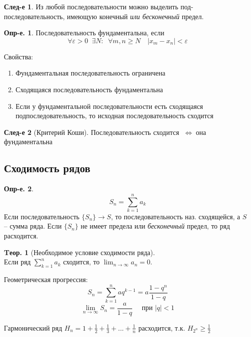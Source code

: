 \documentclass[a4paper,12pt]{article}
\numberwithin{figure}{section}
\theoremstyle{definition}
\newtheorem{definition}{Опр-е.}[section]
\theoremstyle{definition}
\newtheorem{theorem}{Tеор.}[section]
\newtheorem*{corollary}{След-е} %
\def\DS{\displaystyle}
\def\.{\;\;}
\def\eps{\varepsilon}
\def\ntoinf{n\to\infty}
\def\geqs{\geqslant}
\def\iff{$\;\Longleftrightarrow\;$}
\begin{document}
\begin{corollary}
	Из любой последовательности можно выделить под-последовательность,
	имеющую конечный \textit{или бесконечный} предел.
\end{corollary}
\bigskip


\begin{definition}
	Последовательность фундаментальна, если
	\[ \forall \eps>0 \. \exists N :\. \forall m,n \geqs N \quad |x_m - x_n|<\eps \]
\end{definition}

\medskip
Свойства: \begin{enumerate}
	\item Фундаментальная последовательность ограничена
	\item Сходящаяся последовательность фундаментальна
	\item Если у фундаментальной последовательности есть сходящаяся
		  подпоследовательность, то исходная последовательность сходится
\end{enumerate}
\bigskip

\begin{corollary}[Критерий Коши]
	Последовательность сходится \iff она фундаментальна
\end{corollary}


\subsection{Сходимость рядов}

\begin{definition}
	\[ S_n = \sum_{k=1}^n a_k \]
	Если последовательность $\{S_n\} \to S$,
	то последовательность наз. сходящейся, а $S$ -- сумма ряда.
	Если $\{S_n\}$ не имеет предела или \textit{бесконечный} предел,
	то ряд расходится.
\end{definition}
\bigskip

\begin{theorem}[Необходимое условие сходимости ряда] \ \\
	Если ряд $\DS \sum_{k=1}^n a_k$ сходится,
	то $\DS \lim_{\ntoinf}a_n = 0$.
\end{theorem}
\bigskip

Геометрическая прогрессия:
	\[ S_n = \sum_{k=1}^n aq^{k-1} = a\frac{1-q^n}{1-q} \]
	\[ \lim_{\ntoinf}S_n = \frac{a}{1-q} \quad \text{ при } |q|<1 \]

Гармонический ряд $\DS H_n = 1 + \frac12 + \frac13 + ... + \frac1n$
расходится, т.к. $\DS H_{2^n} \geqs \frac12$
\end{document}
